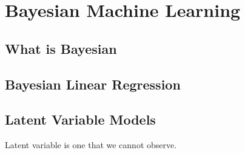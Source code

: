 \chapter{Bayesian Machine Learning}


\section{What is Bayesian}


\section{Bayesian Linear Regression}


\section{Latent Variable Models}

Latent variable is one that we cannot observe.